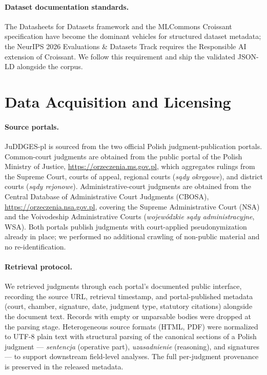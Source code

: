 \documentclass{article}
\begin{document}
\paragraph{Dataset documentation standards.} The Datasheets for Datasets framework \citep{gebru2021datasheets} and the MLCommons Croissant specification have become the dominant vehicles for structured dataset metadata; the NeurIPS 2026 Evaluations \& Datasets Track requires the Responsible AI extension of Croissant. We follow this requirement and ship the validated JSON-LD alongside the corpus.

\section{Data Acquisition and Licensing}
\label{sec:acquisition}

\paragraph{Source portals.} JuDDGES-pl is sourced from the two official Polish judgment-publication portals. Common-court judgments are obtained from the public portal of the Polish Ministry of Justice, \url{https://orzeczenia.ms.gov.pl}, which aggregates rulings from the Supreme Court, courts of appeal, regional courts (\emph{sądy okręgowe}), and district courts (\emph{sądy rejonowe}). Administrative-court judgments are obtained from the Central Database of Administrative Court Judgments (CBOSA), \url{https://orzeczenia.nsa.gov.pl}, covering the Supreme Administrative Court (NSA) and the Voivodeship Administrative Courts (\emph{wojewódzkie sądy administracyjne}, WSA). Both portals publish judgments with court-applied pseudonymization already in place; we performed no additional crawling of non-public material and no re-identification.

\paragraph{Retrieval protocol.} We retrieved judgments through each portal's documented public interface, recording the source URL, retrieval timestamp, and portal-published metadata (court, chamber, signature, date, judgment type, statutory citations) alongside the document text. Records with empty or unparsable bodies were dropped at the parsing stage. Heterogeneous source formats (HTML, PDF) were normalized to UTF-8 plain text with structural parsing of the canonical sections of a Polish judgment --- \emph{sentencja} (operative part), \emph{uzasadnienie} (reasoning), and signatures --- to support downstream field-level analyses. The full per-judgment provenance is preserved in the released metadata.
\end{document}
